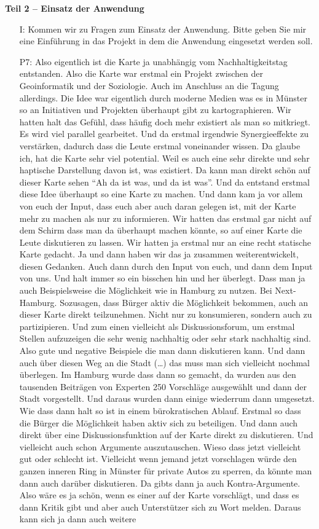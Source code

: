 \textbf{Teil 2 -- Einsatz der Anwendung}
\begin{itemize}
    \item[I:] Kommen wir zu Fragen zum Einsatz der Anwendung. Bitte geben Sie mir eine Einf{\"u}hrung in das Projekt in dem die Anwendung eingesetzt werden soll.
    \item[P7:] Also eigentlich ist die Karte ja unabh{\"a}ngig vom Nachhaltigkeitstag entstanden. Also die Karte war erstmal ein Projekt zwischen der Geoinformatik und der Soziologie. Auch im Anschluss an die Tagung allerdings. Die Idee war eigentlich durch moderne Medien was es in M{\"u}nster so an Initiativen und Projekten {\"u}berhaupt gibt zu kartographieren. Wir hatten halt das Gef{\"u}hl, dass h{\"a}ufig doch mehr existiert als man so mitkriegt. Es wird viel parallel gearbeitet. Und da erstmal irgendwie Synergieeffekte zu verst{\"a}rken, dadurch dass die Leute erstmal voneinander wissen. Da glaube ich, hat die Karte sehr viel potential. Weil es auch eine sehr direkte und sehr haptische Darstellung davon ist, was existiert. Da kann man direkt sch{\"o}n auf dieser Karte sehen "`Ah da ist was, und da ist was"'. Und da entstand erstmal diese Idee {\"u}berhaupt so eine Karte zu machen. Und dann kam ja vor allem von euch der Input, dass euch aber auch daran gelegen ist, mit der Karte mehr zu machen als nur zu informieren. Wir hatten das erstmal gar nicht auf dem Schirm dass man da {\"u}berhaupt machen k{\"o}nnte, so auf einer Karte die Leute diskutieren zu lassen. Wir hatten ja erstmal nur an eine recht statische Karte gedacht. Ja und dann haben wir das ja zusammen weiterentwickelt, diesen Gedanken. Auch dann durch den Input von euch, und dann dem Input von uns. Und halt immer so ein bisschen hin und her {\"u}berlegt. Dass man ja auch Beispielsweise die M{\"o}glichkeit wie in Hamburg zu nutzen. Bei Next-Hamburg. Sozusagen, dass B{\"u}rger aktiv die M{\"o}glichkeit bekommen, auch an dieser Karte direkt teilzunehmen. Nicht nur zu konsumieren, sondern auch zu partizipieren. Und zum einen vielleicht als Diskussionsforum, um erstmal Stellen aufzuzeigen die sehr wenig nachhaltig oder sehr stark nachhaltig sind. Also gute und negative Beispiele die man dann diskutieren kann. Und dann auch {\"u}ber diesen Weg an die Stadt (\dots) das muss man sich vielleicht nochmal {\"u}berlegen. Im Hamburg wurde dass dann so gemacht, da wurden aus den tausenden Beitr{\"a}gen von Experten 250 Vorschl{\"a}ge ausgew{\"a}hlt und dann der Stadt vorgestellt. Und daraus wurden dann einige wiederrum dann umgesetzt. Wie dass dann halt so ist in einem b{\"u}rokratischen Ablauf. Erstmal so dass die B{\"u}rger die M{\"o}glichkeit haben aktiv sich zu beteiligen. Und dann auch direkt {\"u}ber eine Diskussionsfunktion auf der Karte direkt zu diskutieren. Und vielleicht auch schon Argumente auszutauschen. Wieso dass jetzt vielleicht gut oder schlecht ist. Vielleicht wenn jemand jetzt vorschlagen w{\"u}rde den ganzen inneren Ring in M{\"u}nster f{\"u}r private Autos zu sperren, da k{\"o}nnte man dann auch dar{\"u}ber diskutieren. Da gibts dann ja auch Kontra-Argumente. Also w{\"a}re es ja sch{\"o}n, wenn es einer auf der Karte vorschl{\"a}gt, und dass es dann Kritik gibt und aber auch Unterst{\"u}tzer sich zu Wort melden. Daraus kann sich ja dann auch weitere 
\end{itemize}
